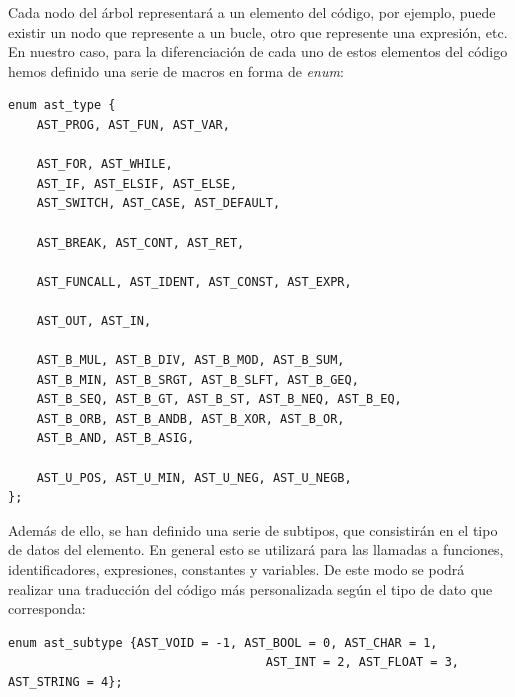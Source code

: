 \documentclass[a4paper,10pt]{article}
\begin{document}
Cada nodo del árbol representará a un elemento del código, por ejemplo, puede existir un nodo que represente a un bucle, otro que represente una expresión, etc. En nuestro caso, para la diferenciación de cada uno de estos elementos del código hemos definido una serie de macros en forma de \textit{enum}:
\begin{lstlisting}
enum ast_type {
	AST_PROG, AST_FUN, AST_VAR, 
	
	AST_FOR, AST_WHILE, 
	AST_IF, AST_ELSIF, AST_ELSE,
	AST_SWITCH, AST_CASE, AST_DEFAULT,
	
	AST_BREAK, AST_CONT, AST_RET,
	
	AST_FUNCALL, AST_IDENT, AST_CONST, AST_EXPR,
	
	AST_OUT, AST_IN, 
	
	AST_B_MUL, AST_B_DIV, AST_B_MOD, AST_B_SUM, 
	AST_B_MIN, AST_B_SRGT, AST_B_SLFT, AST_B_GEQ,
	AST_B_SEQ, AST_B_GT, AST_B_ST, AST_B_NEQ, AST_B_EQ,
	AST_B_ORB, AST_B_ANDB, AST_B_XOR, AST_B_OR,
	AST_B_AND, AST_B_ASIG,
	 
	AST_U_POS, AST_U_MIN, AST_U_NEG, AST_U_NEGB,
};
\end{lstlisting}

Además de ello, se han definido una serie de subtipos, que consistirán en el tipo de datos del elemento. En general esto se utilizará para las llamadas a funciones, identificadores, expresiones, constantes y variables. De este modo se podrá realizar una traducción del código más personalizada según el tipo de dato que corresponda:

\begin{lstlisting}
enum ast_subtype {AST_VOID = -1, AST_BOOL = 0, AST_CHAR = 1, 
									AST_INT = 2, AST_FLOAT = 3, AST_STRING = 4};
\end{lstlisting}
\end{document}
